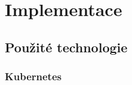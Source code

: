 
\chapter{Implementace}\label{chap:implementation}

\section{Použité technologie}
\subsection{Kubernetes}\label{subsec:k8s}

